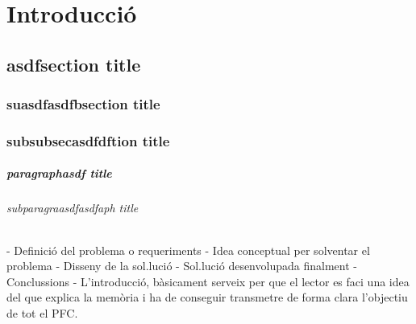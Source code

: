 \chapter{Introducció}

\section{asdfsection title}
\subsection{suasdfasdfbsection title}
\subsection{subsubsecasdfdftion title}
\paragraph{paragraphasdf title}
\subparagraph{subparagraasdfasdfaph title}


        - Definició del problema o requeriments
        - Idea conceptual per solventar el problema
        - Disseny de la sol.lució
        - Sol.lució desenvolupada finalment
        - Conclussions
- L'introducció, bàsicament serveix per que el
        lector es faci una idea del que explica la memòria
        i ha de conseguir transmetre de forma clara
        l'objectiu de tot el PFC.
